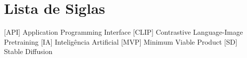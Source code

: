 \documentclass[12pt,a4paper,final]{report}
\begin{document}
\hypersetup{pageanchor=false}
\pagestyle{empty}
\onehalfspacing


\newpage
\mbox{}
\setcounter{page}{0}
\newpage


\cleardoublepage
\pagestyle{empty}
\onehalfspacing
\cleardoublepage
\newpage
\mbox{}
\newpage

\thispagestyle{empty}
\newpage
\mbox{}
\newpage


\thispagestyle{empty}
\newpage
\mbox{}
\newpage

\thispagestyle{empty}
\newpage
\mbox{}
\newpage

\tableofcontents
\hypersetup{pageanchor=true}
\thispagestyle{empty}

\chapter*{Lista de Siglas}
\begin{acronym}[Ibovespa]
      [API]   {Application Programming Interface}
     [CLIP]  {Contrastive Language-Image Pretraining}
       [IA]    {Inteligência Artificial} 
      [MVP]   {Minimum Viable Product}
       [SD]    {Stable Diffusion}
\end{acronym}
\thispagestyle{empty}

\newpage
\mbox{}
\newpage

\listoffigures
\thispagestyle{empty}
\listoftables
\thispagestyle{empty}

\newpage
\mbox{}
\newpage

\pagestyle{right} 

\cleardoublepage


\cleardoublepage


\cleardoublepage


\cleardoublepage


\cleardoublepage


%  
%  



\makeatletter
\def\thebibliography#1{\chapter*{Referências Bibliográficas\@mkboth
    {Referências Bibliográficas}{Referências Bibliográficas}}\list
    {[\arabic{enumi}]}{\settowidth\labelwidth{[#1]}\leftmargin\labelwidth
\advance\leftmargin\labelsep
\usecounter{enumi}}
\def\newblock{\hskip .11em plus .33em minus .07em}
\sloppy\clubpenalty4000\widowpenalty4000
\sfcode`\.=1000\relax}
\makeatother


\end{document}
